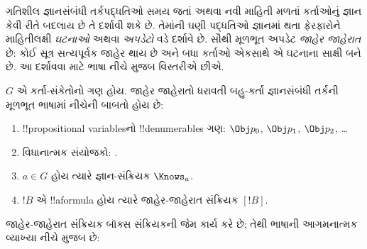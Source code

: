 \documentclass[../../../include/open-logic-section]{subfiles}
\begin{document}


ગતિશીલ જ્ઞાનસંબંધી તર્કપદ્ધતિઓ સમય જતાં અથવા નવી માહિતી મળતાં
કર્તાઓનું જ્ઞાન કેવી રીતે બદલાય છે તે દર્શાવી શકે છે. તેમાંની
ઘણી પદ્ધતિઓ જ્ઞાનમાં થતા ફેરફારોને માહિતીલક્ષી \emph{ઘટનાઓ}
અથવા \emph{અપડેટો} વડે દર્શાવે છે. સૌથી મૂળભૂત અપડેટ
\emph{જાહેર જાહેરાત} છે: કોઈ સૂત્ર સત્યપૂર્વક જાહેર થાય છે
અને બધા કર્તાઓ એકસાથે એ ઘટનાના સાક્ષી બને છે. આ દર્શાવવા
માટે ભાષા નીચે મુજબ વિસ્તરીએ છીએ.

\begin{defn}
$G$ એ કર્તા-સંકેતોનો ગણ હોય. જાહેર જાહેરાતો ધરાવતી બહુ-કર્તા
જ્ઞાનસંબંધી તર્કની મૂળભૂત ભાષામાં નીચેની બાબતો હોય છે:
\begin{enumerate}
  \item !!{propositional variable}sનો !!{denumerable}s ગણ: $\Obj
    p_0$, $\Obj p_1$, $\Obj p_2$, \dots
  \item વિધાનાત્મક સંયોજકો: \startycommalist
  .
  \item $a \in G$ હોય ત્યારે જ્ઞાન-સંક્રિયક $\Knows_a$.
  \item $!B$ એ !!a{formula} હોય ત્યારે જાહેર-જાહેરાત
  સંક્રિયક $[!B]$.
\end{enumerate}
\end{defn}


જાહેર-જાહેરાત સંક્રિયક બૉક્સ સંક્રિયકની જેમ કાર્ય કરે છે;
તેથી ભાષાની આગમનાત્મક વ્યાખ્યા નીચે મુજબ છે:
\end{document}
